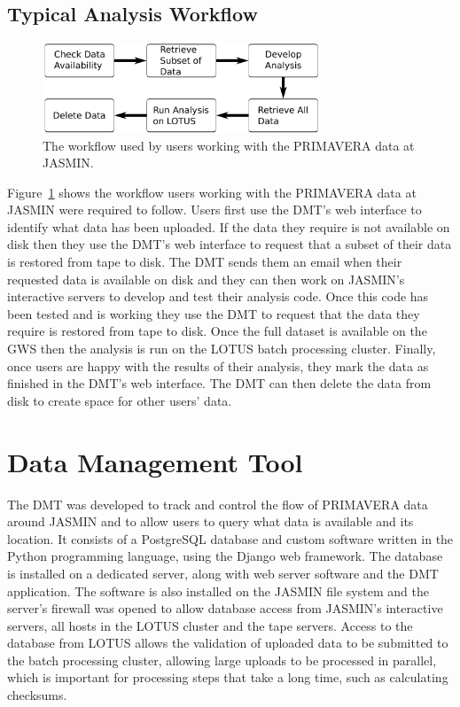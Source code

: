 \documentclass[gmd, manuscript]{copernicus}
\begin{document}
\subsection{Typical Analysis Workflow}

\begin{figure}[t]
	\includegraphics[width=8.3cm]{fig02.pdf}
	\caption{The workflow used by users working with the PRIMAVERA data at JASMIN.}
	\label{analysis_workflow}
\end{figure}

Figure~\ref{analysis_workflow} shows the workflow users working with the PRIMAVERA data at JASMIN were required to follow. Users first use the DMT's web interface to identify what data has been uploaded. If the data they require is not available on disk then they use the DMT's web interface to request that a subset of their data is restored from tape to disk. The DMT sends them an email when their requested data is available on disk and they can then work on JASMIN's interactive servers to develop and test their analysis code. Once this code has been tested and is working they use the DMT to request that the data they require is restored from tape to disk. Once the full dataset is available on the GWS then the analysis is run on the LOTUS batch processing cluster. Finally, once users are happy with the results of their analysis, they mark the data as finished in the DMT's web interface. The DMT can then delete the data from disk to create space for other users' data.

\section{Data Management Tool}

The DMT was developed to track and control the flow of PRIMAVERA data around JASMIN and to allow users to query what data is available and its location. It consists of a PostgreSQL database and custom software written in the Python programming language, using the Django web framework. The database is installed on a dedicated server, along with web server software and the DMT application. The software is also installed on the JASMIN file system and the server's firewall was opened to allow database access from JASMIN's interactive servers, all hosts in the LOTUS cluster and the tape servers. Access to the database from LOTUS allows the validation of uploaded data to be submitted to the batch processing cluster, allowing large uploads to be processed in parallel, which is important for processing steps that take a long time, such as calculating checksums.
\end{document}

